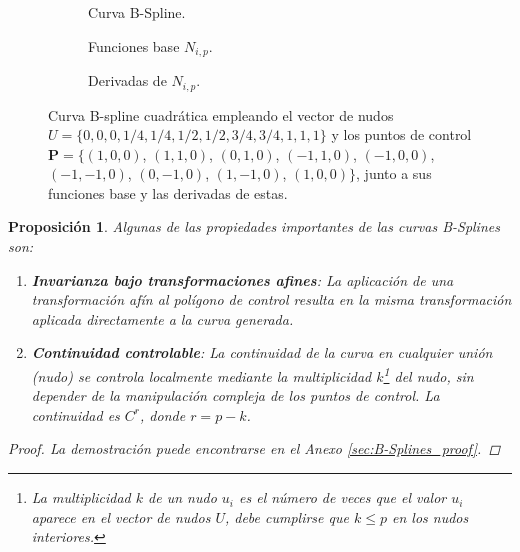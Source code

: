 \documentclass[11pt]{book}
\theoremstyle{plain} %
\newtheorem{proposicion}[teorema]{Proposición}
\theoremstyle{definition} %
\theoremstyle{definition} %
\begin{document}
\begin{figure}[H]
    \centering
    \begin{subfigure}{0.32\textwidth}
        
        \caption{Curva B-Spline.}
        \label{fig:curva_Spline_1}
    \end{subfigure}
    \hfill
    \begin{subfigure}{0.32\textwidth}
        
        \caption{Funciones base $N_{i,p}$.}
        \label{fig:curva_Spline_2}
    \end{subfigure}
    \begin{subfigure}{0.32\textwidth}
        
        \caption{Derivadas de $N_{i,p}$.}
        \label{fig:curva_Spline_3}
    \end{subfigure}
    \caption{Curva B-spline cuadrática empleando el vector de nudos $U = \{ 0, 0, 0, 1/4, 1/4, 1/2, 1/2, 3/4, 3/4, 1, 1, 1 \}$ y los puntos de control $\mathbf{P} = \{ (1,0,0)$, $(1,1,0)$, $(0,1,0)$, $(-1,1,0)$, $(-1,0,0)$, $(-1,-1,0)$, $(0,-1,0)$, $(1,-1,0)$, $(1,0,0) \}$, junto a sus funciones base y las derivadas de estas.}    \label{fig:curva_Spline}   
\end{figure}

\vspace{-0.5cm}

\begin{proposicion}
    \label{prop:bspline_curvas_fundamentales}
    Algunas de las propiedades importantes de las curvas B-Splines son:
    \begin{enumerate}
        \item \textbf{Invarianza bajo transformaciones afines}: La aplicación de una transformación afín al polígono de control resulta en la misma transformación aplicada directamente a la curva generada.
        
        \item \textbf{Continuidad controlable}: La continuidad de la curva en cualquier unión (nudo) se controla localmente mediante la multiplicidad $k$\footnote{La multiplicidad $k$ de un nudo $u_i$ es el número de veces que el valor $u_i$ aparece en el vector de nudos $U$, debe cumplirse que $k\leq p$ en los nudos interiores.} del nudo, sin depender de la manipulación compleja de los puntos de control. La continuidad es $C^r$, donde $r = p - k$.
    \end{enumerate}
    \begin{proof}
        La demostración puede encontrarse en el Anexo \ref{sec:B-Splines_proof}.
    \end{proof}
\end{proposicion}
\end{document}
